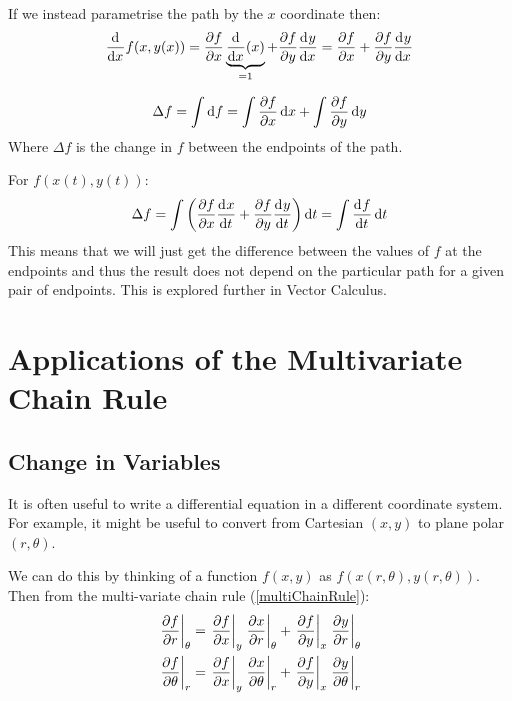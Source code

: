 \documentclass[../main.tex]{subfiles}
\begin{document}
If we instead parametrise the path by the $x$ coordinate then:
\[
  \deriv{}{x}f(x, y(x)) = \pderiv{f}{x} \underbrace{\deriv{}{x}(x)}_{=1} + \pderiv{f}{y} \deriv{y}{x} = \pderiv{f}{x} + \pderiv{f}{y}\deriv{y}{x}
\]
\begin{theorem}
  \[
    \Delta f = \int  \d{f} = \int \pderiv{f}{x} \d{x} + \int \pderiv{f}{y} \d{y}
    \label{multiChainRule}
  \]
  Where $\Delta f$ is the change in $f$ between the endpoints of the path.
\end{theorem}
For $f(x(t), y(t))$:
\[
  \Delta f = \int \left(\pderiv{f}{x}\deriv{x}{t} + \pderiv{f}{y}\deriv{y}{t}\right) \d{t} = \int \deriv{f}{t} \d{t}
\]
This means that we will just get the difference between the values of $f$ at the endpoints and thus the result does not depend on the particular path for a given pair of endpoints.
This is explored further in Vector Calculus.
\section{Applications of the Multivariate Chain Rule}
\subsection{Change in Variables}
It is often useful to write a differential equation in a different coordinate system.
For example, it might be useful to convert from Cartesian $(x, y)$ to plane polar $(r, \theta)$.

We can do this by thinking of a function $f(x, y)$ as $f(x(r, \theta), y(r, \theta))$.
Then from the multi-variate chain rule (\cref{multiChainRule}):
\begin{align*}
  \at{\pderiv{f}{r}}{\theta} &= \at{\pderiv{f}{x}}{y} \at{\pderiv{x}{r}}{\theta} + \at{\pderiv{f}{y}}{x} \at{\pderiv{y}{r}}{\theta} \\
  \at{\pderiv{f}{\theta}}{r} &= \at{\pderiv{f}{x}}{y} \at{\pderiv{x}{\theta}}{r} + \at{\pderiv{f}{y}}{x} \at{\pderiv{y}{\theta}}{r}
\end{align*}
\end{document}
